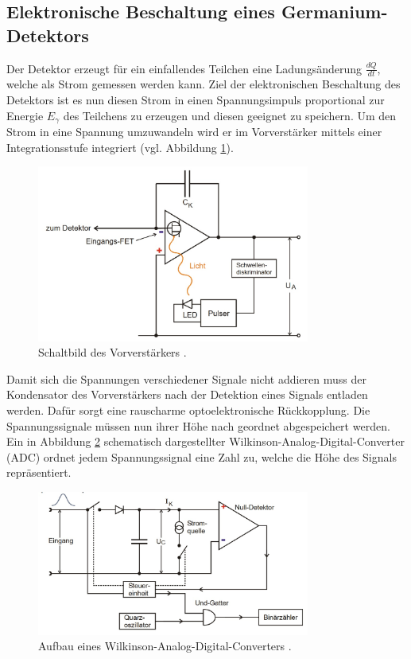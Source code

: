 \subsection{Elektronische Beschaltung eines Germanium-Detektors}
\label{subsec:Elektronische Beschaltung eines Germanium-Detektors}
Der Detektor erzeugt für ein einfallendes Teilchen eine Ladungsänderung $\frac{dQ}{dt}$, welche als Strom gemessen werden kann.
Ziel der elektronischen Beschaltung des Detektors ist es nun diesen Strom in einen Spannungsimpuls proportional zur Energie $E_\gamma$ des Teilchens zu erzeugen und diesen geeignet zu speichern.
Um den Strom in eine Spannung umzuwandeln wird er im Vorverstärker mittels einer Integrationsstufe integriert (vgl. Abbildung \ref{fig:t:1}).
\begin{figure}
\centering
\includegraphics[width=0.8\textwidth]{content/skizzen/aufbau2.jpg}
\caption{Schaltbild des Vorverstärkers \cite{sample}.}
\label{fig:t:1}
\end{figure}
Damit sich die Spannungen verschiedener Signale nicht addieren muss der Kondensator des Vorverstärkers nach der Detektion eines Signals entladen werden.
Dafür sorgt eine rauscharme optoelektronische Rückkopplung.
Die Spannungssignale müssen nun ihrer Höhe nach geordnet abgespeichert werden.
Ein in Abbildung \ref{fig:t:2} schematisch dargestellter Wilkinson-Analog-Digital-Converter (ADC) ordnet jedem Spannungssignal eine Zahl zu, welche die Höhe des Signals repräsentiert.
\begin{figure}
\centering
\includegraphics[width=0.8\textwidth]{content/skizzen/aufbau3.jpg}
\caption{Aufbau eines Wilkinson-Analog-Digital-Converters \cite{sample}.}
\label{fig:t:2}
\end{figure}
